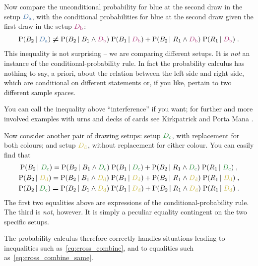 \documentclass[\ifafour a4paper,12pt,\else a5paper,10pt,\fi%
onecolumn,oneside,article,%
british%
]{memoir}
\theoremstyle{remark}
\theoremstyle{innote}
\newcommand*{\citey}{\parencites*}
\newcommand*{\p}{\mathrm{P}}%
\renewcommand*{\|}[1][]{\nonscript\,#1\vert\nonscript\;\mathopen{}}
\newcommand*{\sect}{\S}%
\newcommand*{\yDa}{\textcolor{mypurpleblue}{D_{\textrm{a}}}}
\newcommand*{\yDb}{\textcolor{myredpurple}{D_{\textrm{b}}}}
\newcommand*{\yDc}{\textcolor{mygreen}{D_{\textrm{c}}}}
\newcommand*{\yDd}{\textcolor{myyellow}{D_{\textrm{d}}}}
\begin{document}
\medskip

Now compare the unconditional probability for blue at the second draw in
the setup $\yDa$, with the conditional probabilities for blue at the second
draw given the first draw in the setup $\yDb$:
\begin{equation}
  \label{eq:cross_combine}
  \p(B_{2} \| \yDa) \mathrel{\bm{\ne}}
  \p(B_{2} \| B_{1} \land \yDb) \; \p( B_{1} \| \yDb) +
  \p(B_{2} \| R_{1} \land \yDb)  \; \p( R_{1} \| \yDb) \;.
\end{equation}
This inequality is not surprising -- we are comparing different setups. It
is \emph{not} an instance of the conditional-probability rule. In fact the
probability calculus has nothing to say, a priori, about the relation
between the left side and right side, which are conditional on different
statements or, if you like, pertain to two different sample spaces.

You can call the inequality above \enquote{interference} if you want; for
further and more involved examples with urns and decks of cards see
Kirkpatrick \citey{kirkpatrick2001_r2003,kirkpatrick2002_r2003} and Porta
Mana \citey[\sect~IV]{portamana2003_r2004}.

\medskip

Now consider another pair of drawing setups: setup $\yDc$, with replacement
for both colours; and setup $\yDd$, without replacement for either colour.
You can easily find that
\begin{gather}
  \p(B_{2} \| \yDc) =%
  \p(B_{2} \| B_{1} \land \yDc) \; \p( B_{1} \| \yDc) +
  \p(B_{2} \| R_{1} \land \yDc)  \; \p( R_{1} \| \yDc) \;,
  \\
  \p(B_{2} \| \yDd) =%
  \p(B_{2} \| B_{1} \land \yDd) \; \p( B_{1} \| \yDd) +
  \p(B_{2} \| R_{1} \land \yDd)  \; \p( R_{1} \| \yDd) \;,
  \\
  \label{eq:cross_combine_same}
  \p(B_{2} \| \yDc) \mathrel{\bm{=}}
  \p(B_{2} \| B_{1} \land \yDd) \; \p( B_{1} \| \yDd) +
  \p(B_{2} \| R_{1} \land \yDd)  \; \p( R_{1} \| \yDd) \;.
\end{gather}
The first two equalities above are expressions of the
conditional-probability rule. The third is \emph{not}, however. It is
simply a peculiar equality contingent on the two specific setups.

The probability calculus therefore correctly handles situations leading to
inequalities such as~\eqref{eq:cross_combine}, and to equalities such
as~\eqref{eq:cross_combine_same}.
\end{document}
